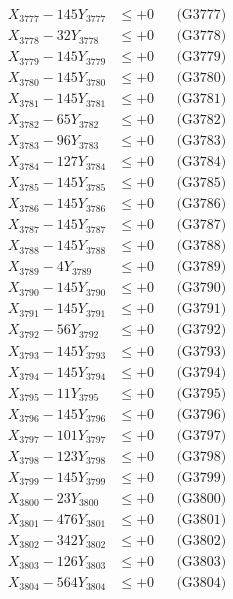 \documentclass[a4paper,10pt]{article}
\begin{document}
{\begin{align}
X_{3777} - 145Y_{3777} &\leq +0 && \text{(G3777)} \\
X_{3778} - 32Y_{3778} &\leq +0 && \text{(G3778)} \\
X_{3779} - 145Y_{3779} &\leq +0 && \text{(G3779)} \\
X_{3780} - 145Y_{3780} &\leq +0 && \text{(G3780)} \\
\allowbreak
X_{3781} - 145Y_{3781} &\leq +0 && \text{(G3781)} \\
X_{3782} - 65Y_{3782} &\leq +0 && \text{(G3782)} \\
X_{3783} - 96Y_{3783} &\leq +0 && \text{(G3783)} \\
X_{3784} - 127Y_{3784} &\leq +0 && \text{(G3784)} \\
X_{3785} - 145Y_{3785} &\leq +0 && \text{(G3785)} \\
X_{3786} - 145Y_{3786} &\leq +0 && \text{(G3786)} \\
X_{3787} - 145Y_{3787} &\leq +0 && \text{(G3787)} \\
X_{3788} - 145Y_{3788} &\leq +0 && \text{(G3788)} \\
X_{3789} - 4Y_{3789} &\leq +0 && \text{(G3789)} \\
X_{3790} - 145Y_{3790} &\leq +0 && \text{(G3790)} \\
\allowbreak
X_{3791} - 145Y_{3791} &\leq +0 && \text{(G3791)} \\
X_{3792} - 56Y_{3792} &\leq +0 && \text{(G3792)} \\
X_{3793} - 145Y_{3793} &\leq +0 && \text{(G3793)} \\
X_{3794} - 145Y_{3794} &\leq +0 && \text{(G3794)} \\
X_{3795} - 11Y_{3795} &\leq +0 && \text{(G3795)} \\
X_{3796} - 145Y_{3796} &\leq +0 && \text{(G3796)} \\
X_{3797} - 101Y_{3797} &\leq +0 && \text{(G3797)} \\
X_{3798} - 123Y_{3798} &\leq +0 && \text{(G3798)} \\
X_{3799} - 145Y_{3799} &\leq +0 && \text{(G3799)} \\
X_{3800} - 23Y_{3800} &\leq +0 && \text{(G3800)} \\
\allowbreak
X_{3801} - 476Y_{3801} &\leq +0 && \text{(G3801)} \\
X_{3802} - 342Y_{3802} &\leq +0 && \text{(G3802)} \\
X_{3803} - 126Y_{3803} &\leq +0 && \text{(G3803)} \\
X_{3804} - 564Y_{3804} &\leq +0 && \text{(G3804)} \\

\end{align}}
\end{document}
